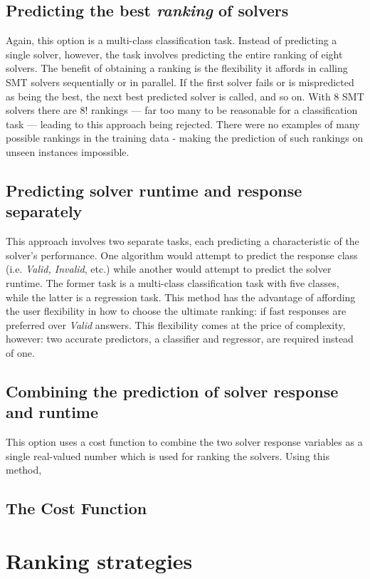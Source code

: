 \subsection{Predicting the best \textit{ranking} of solvers} Again, this option is a multi-class classification task. 
Instead of predicting a single solver, however, the task involves predicting the entire ranking of eight solvers. 
The benefit of obtaining a ranking is the flexibility it affords in calling SMT solvers sequentially or in parallel.
If the first solver fails or is mispredicted as being the best, the next best predicted solver is called, and so on.
With 8 SMT solvers there are 8! rankings --- far too many to be reasonable for a classification task --- leading to this approach being rejected.
There were no examples of many possible rankings in the training data - making the prediction of such rankings on unseen instances impossible.
\subsection{Predicting solver runtime and response separately}
This approach involves two separate tasks, each predicting a characteristic of the solver's performance. 
One algorithm would attempt to predict the response class (i.e. \textit{Valid, Invalid}, etc.) while another would attempt to predict the solver runtime.
The former task is a multi-class classification task with five classes, while the latter is a regression task.
This method has the advantage of affording the user flexibility in how to choose the ultimate ranking: if fast responses are preferred over \textit{Valid} answers.
This flexibility comes at the price of complexity, however: two accurate predictors, a classifier and regressor, are required instead of one.
\subsection{Combining the prediction of solver response and runtime}
This option uses a cost function to combine the two solver response variables as a single real-valued number which is used for ranking the solvers.
Using this method,  

\subsection{The Cost Function}
\label{sub:scoring}

\section{Ranking strategies}
\label{sec:strategies}

